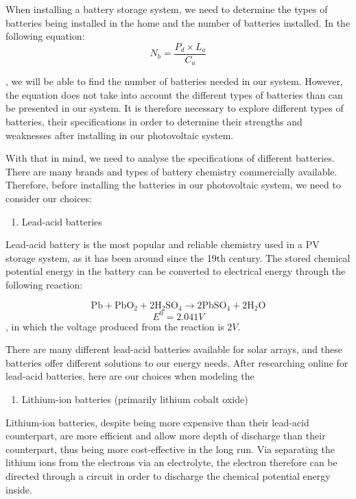 
When installing a battery storage system, we need to determine the types of batteries being installed in the home and the number of batteries installed. In the following equation:
\begin{equation}
    N_b = \frac{P_d \times L_a}{C_a}
\end{equation}

, we will be able to find the number of batteries needed in our system. However, the equation does not take into account the different types of batteries than can be presented in our system. It is therefore necessary to explore different types of batteries, their specifications in order to determine their strengths and weaknesses after installing in our photovoltaic system.

With that in mind, we need to analyse the specifications of different batteries. There are many brands and types of battery chemistry commercially available. Therefore, before installing the batteries in our photovoltaic system, we need to consider our choices:
\begin{enumerate}
    \item Lead-acid batteries
\end{enumerate}
Lead-acid battery is the most popular and reliable chemistry used in a PV storage system, as it has been around since the 19th century. The stored chemical potential energy in the battery can be converted to electrical energy through the following reaction:

$$\mathrm{Pb}+\mathrm{PbO}_{2}+2 \mathrm{H}_{2} \mathrm{SO}_{4} \rightarrow 2 \mathrm{PbSO}_{4}+2 \mathrm{H}_{2} \mathrm{O}$$
$$
E^{0}=2.041 V
$$
, in which the voltage produced from the reaction is $2V$.\cite{wiki:lead_acid_battery}

There are many different lead-acid batteries available for solar arrays, and these batteries offer different solutions to our energy needs. After researching online for lead-acid batteries, here are our choices when modeling the 

\begin{enumerate}[resume]
    \item Lithium-ion batteries (primarily lithium cobalt oxide)
\end{enumerate}
Lithium-ion batteries, despite being more expensive than their lead-acid counterpart, are more efficient and allow more depth of discharge than their counterpart, thus being more cost-effective in the long run. Via separating the lithium ions from the electrons via an electrolyte, the electron therefore can be directed through a circuit in order to discharge the chemical potential energy inside.\cite{wiki:li_ion_battery} \\

